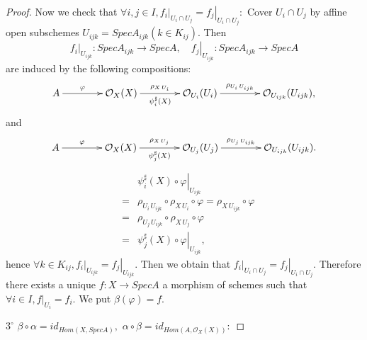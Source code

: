 \begin{proof}
Now we check that $\forall i,j\in I, \left.f_i\right|_{U_i\cap
U_j}=\left.f_j\right|_{U_i\cap U_j}:$ Cover $U_i\cap U_j$ by affine
open subschemes $U_{ijk}=SpecA_{ijk}(k\in K_{ij}).$ Then
$$\left.f_i\right|_{U_{ijk}}: SpecA_{ijk}\rightarrow SpecA,\quad
\left.f_j\right|_{U_{ijk}}: SpecA_{ijk}\rightarrow SpecA$$
are induced by the following compositions:
\[ \xymatrix@C=4em{
   A \ar[r]^-{\varphi} & \mathcal {O}_X(X)
   \ar[r]_-{\psi_i^{\sharp}(X)}^-{\rho_{X\,U_i}} & \mathcal {O}_{U_i}(U_i)
   \ar[r]^-{\rho_{U_i\,U_{ijk}}} & \mathcal {O}_{U_{ijk}}(U_{ijk}), }
\]
and
\[ \xymatrix@C=4em{
   A \ar[r]^-{\varphi} & \mathcal {O}_X(X)
   \ar[r]_-{\psi_j^{\sharp}(X)}^-{\rho_{X\,U_j}} & \mathcal {O}_{U_j}(U_j)
   \ar[r]^-{\rho_{U_j\,U_{ijk}}} & \mathcal {O}_{U_{ijk}}(U_{ijk}). }
\]
\begin{eqnarray*}
& & \left.\psi_i^{\sharp}(X)\circ\varphi\right|_{U_{ijk}} \\
& = & \rho_{U_i\,U_{ijk}}\circ\rho_{X\,U_i}\circ\varphi =
\rho_{X\,U_{ijk}}\circ\varphi                           \\
& = & \rho_{U_j\,U_{ijk}}\circ\rho_{X\,U_j}\circ\varphi \\
& = & \left.\psi_j^{\sharp}(X)\circ\varphi\right|_{U_{ijk}},
\end{eqnarray*}
hence $\forall k\in K_{ij},
\left.f_i\right|_{U_{ijk}}=\left.f_j\right|_{U_{ijk}}.$ Then we
obtain that $\left.f_i\right|_{U_i\cap
U_j}=\left.f_j\right|_{U_i\cap U_j}.$ Therefore there exists a
unique $f: X\rightarrow SpecA$ a morphism of schemes such that
$\forall i\in I, \left.f\right|_{U_i}=f_i.$ We put
$\beta(\varphi)=f.$

$\mathit{3^{\circ}}$ $\beta\circ\alpha=id_{Hom(X,SpecA)},$
$\alpha\circ\beta=id_{Hom(A,\mathcal {O}_X(X))}:$


\end{proof}
